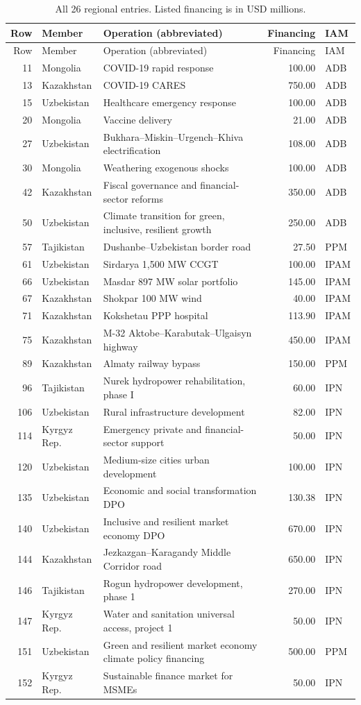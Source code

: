 \documentclass[11pt,a4paper]{article}
\begin{document}
\begingroup\footnotesize
\setlength{\tabcolsep}{4pt}
\renewcommand{\arraystretch}{.95}
\begin{longtable}{r p{1.9cm} p{8.0cm} r l}
\caption{All 26 regional entries. Listed financing is in USD millions.}\label{tab:appendix}\\
\toprule Row&Member&Operation (abbreviated)&Financing&IAM\\\midrule\endfirsthead
\toprule Row&Member&Operation (abbreviated)&Financing&IAM\\\midrule\endhead
11&Mongolia&COVID-19 rapid response&100.00&ADB\\
13&Kazakhstan&COVID-19 CARES&750.00&ADB\\
15&Uzbekistan&Healthcare emergency response&100.00&ADB\\
20&Mongolia&Vaccine delivery&21.00&ADB\\
27&Uzbekistan&Bukhara--Miskin--Urgench--Khiva electrification&108.00&ADB\\
30&Mongolia&Weathering exogenous shocks&100.00&ADB\\
42&Kazakhstan&Fiscal governance and financial-sector reforms&350.00&ADB\\
50&Uzbekistan&Climate transition for green, inclusive, resilient growth&250.00&ADB\\
57&Tajikistan&Dushanbe--Uzbekistan border road&27.50&PPM\\
61&Uzbekistan&Sirdarya 1,500 MW CCGT&100.00&IPAM\\
66&Uzbekistan&Masdar 897 MW solar portfolio&145.00&IPAM\\
67&Kazakhstan&Shokpar 100 MW wind&40.00&IPAM\\
71&Kazakhstan&Kokshetau PPP hospital&113.90&IPAM\\
75&Kazakhstan&M-32 Aktobe--Karabutak--Ulgaisyn highway&450.00&IPAM\\
89&Kazakhstan&Almaty railway bypass&150.00&PPM\\
96&Tajikistan&Nurek hydropower rehabilitation, phase I&60.00&IPN\\
106&Uzbekistan&Rural infrastructure development&82.00&IPN\\
114&Kyrgyz Rep.&Emergency private and financial-sector support&50.00&IPN\\
120&Uzbekistan&Medium-size cities urban development&100.00&IPN\\
135&Uzbekistan&Economic and social transformation DPO&130.38&IPN\\
140&Uzbekistan&Inclusive and resilient market economy DPO&670.00&IPN\\
144&Kazakhstan&Jezkazgan--Karagandy Middle Corridor road&650.00&IPN\\
146&Tajikistan&Rogun hydropower development, phase 1&270.00&IPN\\
147&Kyrgyz Rep.&Water and sanitation universal access, project 1&50.00&IPN\\
151&Uzbekistan&Green and resilient market economy climate policy financing&500.00&PPM\\
152&Kyrgyz Rep.&Sustainable finance market for MSMEs&50.00&IPN\\\bottomrule
\end{longtable}\endgroup
\end{document}
